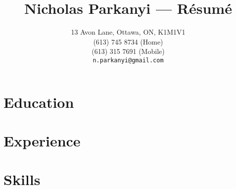 \documentclass[10pt,letterpaper,notitlepage]{article}
\date{#2}}
\newcommand{\resumetitle}[2]{\title{\vspace{-6ex} #1 --- R\'{e}sum\'{e}\vspace{-3ex}}
  \date{#2}}
\begin{document}

\resumetitle{Nicholas Parkanyi}{13 Avon Lane, Ottawa, ON, K1M1V1 \\
                                (613) 745 8734 (Home) \\ (613) 315 7691 (Mobile) \\
                                \texttt{n.parkanyi@gmail.com}}

\maketitle

\section*{Education}

\section*{Experience}

\section*{Skills}
\end{document}
